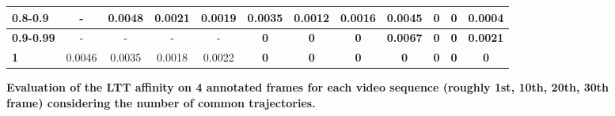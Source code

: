 \begin{figure}[htbp]
{\begin{tabular}{|l|@{ }c@{ }|@{ }c@{ }|@{ }c@{ }|@{ }c@{ }|@{ }c@{ }|@{ }c@{ }|@{ }c@{ }|@{ }c@{ }|@{ }c@{ }|@{ }c@{ }|@{ }c@{ }|}
\textbf{0.8-0.9}&-&0.0048&0.0021&0.0019&0.0035&0.0012&0.0016&0.0045&0&0&0.0004\\\hline
\textbf{0.9-0.99}&-&-&-&-&\textbf{0}&\textbf{0}&\textbf{0}&\textbf{0.0067}&\textbf{0}&\textbf{0}&\textbf{0.0021}\\\hline
\textbf{1}&0.0046&0.0035&0.0018&0.0022&\textbf{0}&\textbf{0}&\textbf{0}&\textbf{0}&\textbf{0}&\textbf{0}&\textbf{0}\\\hline
\end{tabular}
}
\caption[Evaluation of the LTT affinity on 4 annotated frames for each video sequence considering the number of common trajectories]{
{\bf Evaluation of the LTT affinity on 4 annotated frames for each video sequence (roughly 1st, 10th, 20th, 30th frame) considering the number of common trajectories.}}
\label{fig:ltt_10th}
\end{figure}
